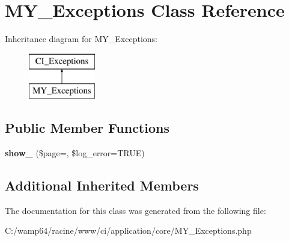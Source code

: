 \hypertarget{class_m_y___exceptions}{}\section{M\+Y\+\_\+\+Exceptions Class Reference}
\label{class_m_y___exceptions}
Inheritance diagram for M\+Y\+\_\+\+Exceptions\+:\begin{figure}[H]
\begin{center}
\leavevmode
\includegraphics[height=2.000000cm]{class_m_y___exceptions}
\end{center}
\end{figure}
\subsection*{Public Member Functions}
\begin{DoxyCompactItemize}
\item 
\mbox{\label{class_m_y___exceptions_aa37342c25b4fabfad860d41ea916ed71}} 
{\bfseries show\+\_} (\$page=\textquotesingle{}\textquotesingle{}, \$log\+\_\+error=T\+R\+UE)
\end{DoxyCompactItemize}
\subsection*{Additional Inherited Members}


The documentation for this class was generated from the following file\+:\begin{DoxyCompactItemize}
\item 
C\+:/wamp64/racine/www/ci/application/core/M\+Y\+\_\+\+Exceptions.\+php\end{DoxyCompactItemize}

